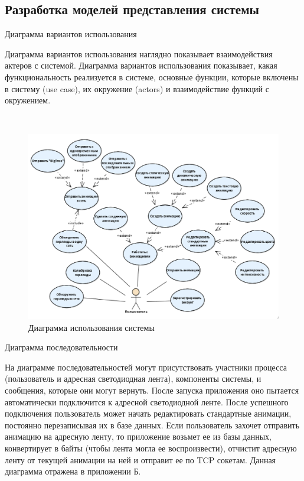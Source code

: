 \subsection{Разработка моделей представления системы}
\label{sec:develop:umlDiagrams}

Диаграмма вариантов использования

Диаграмма вариантов использования наглядно показывает взаимодействия актеров с системой. Диаграмма вариантов использования показывает, какая функциональность реализуется в системе, основные функции, которые включены в систему (use case), их окружение (actors) и взаимодействие функций с окружением.

~
\begin{figure}[H]
\centering
	\includegraphics[scale=0.65]{figures/diagrams/uml_useCase.png}
	\caption{Диаграмма использования системы}
	\label{fig:develop:umlDiagrams:useCase}
\end{figure}

Диаграмма последовательности

На диаграмме последовательностей могут присутствовать участники процесса (пользователь и адресная светодиодная лента), компоненты системы, и сообщения, которые они могут вернуть. После запуска приложения оно пытается автоматически подключится к адресной светодиодной ленте. После успешного подключения пользователь может начать редактировать стандартные анимации, постоянно перезаписывая их в базе данных. Если пользователь захочет отправить анимацию на адресную ленту, то приложение возьмет ее из базы данных, конвертирует в байты (чтобы лента могла ее воспроизвести), отчистит адресную ленту от текущей анимации на ней и отправит ее по TCP сокетам. Данная диаграмма отражена в приложении Б.

